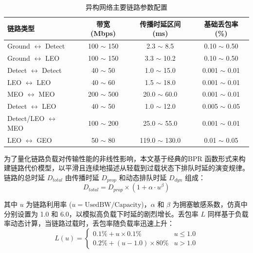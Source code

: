 \documentclass[print, master, vlined]{DissertUESTC}
\begin{document}
    \begin{table}[htbp]
        \caption{异构网络主要链路参数配置}
        \centering
        \small
        \begin{tabular}{lccc}
        \toprule
        \textbf{链路类型} & \textbf{带宽 (Mbps)} & \textbf{传播时延区间 (ms)} & \textbf{基础丢包率 (\%)} \\
        \midrule
        Ground $\leftrightarrow$ Detect & 100 $\sim$ 150 & 2.3 $\sim$ 8.5 & 0.10 $\sim$ 0.50 \\
        Ground $\leftrightarrow$ LEO    & 100 $\sim$ 150 & 3.3 $\sim$ 10.2 & 0.10 $\sim$ 0.50 \\
        Detect $\leftrightarrow$ Detect & 40 $\sim$ 50 & 1.0 $\sim$ 15.0 & 0.001 $\sim$ 0.01 \\
        LEO $\leftrightarrow$ LEO       & 40 $\sim$ 60 & 1.5 $\sim$ 18.0 & 0.001 $\sim$ 0.01 \\
        MEO $\leftrightarrow$ MEO       & 200 $\sim$ 500 & 20.0 $\sim$ 60.0 & 0.001 $\sim$ 0.01 \\
        Detect $\leftrightarrow$ LEO    & 40 $\sim$ 50 & 1.0 $\sim$ 12.0 & 0.005 $\sim$ 0.05 \\
        Detect/LEO $\leftrightarrow$ MEO       & 100 $\sim$ 200 & 25.0 $\sim$ 55.0 & 0.001 $\sim$ 0.01 \\
        LEO $\leftrightarrow$ GEO       & 50 $\sim$ 80 & 119.0 $\sim$ 130.0 & 0.01 $\sim$ 0.05 \\
        \bottomrule
        \end{tabular}
        \label{tab: 异构网络链路参数配置}
    \end{table}

    为了量化链路负载对传输性能的非线性影响，本文基于经典的BPR 函数形式来构建链路代价模型，以平滑且连续地描述从轻载到过载状态下排队时延的演变规律。链路的总时延 $D_{total}$ 由传播时延 $D_{prop}$ 和动态排队时延 $D_{dyn}$ 组成：
    \begin{equation}
        D_{total} = D_{prop} \times (1 + \alpha \cdot u^\beta)
    \end{equation}
    
    其中 $u$ 为链路利用率 ($u = \text{UsedBW} / \text{Capacity}$)，$\alpha$ 和 $\beta$ 为拥塞敏感系数，仿真中分别设置为 1.0 和 6.0，以模拟高负载下时延的剧烈增长。丢包率 $L$ 同样基于负载率动态计算，当链路过载时，丢包率随负载率迅速上升：
    \begin{equation}
    L(u) =
    \begin{cases}
      0.1\% + u \times 0.1\% & u \le 1.0 \\
      0.2\% + (u-1.0) \times 80\% & u > 1.0 
    \end{cases}
    \end{equation}
    
\end{document}
